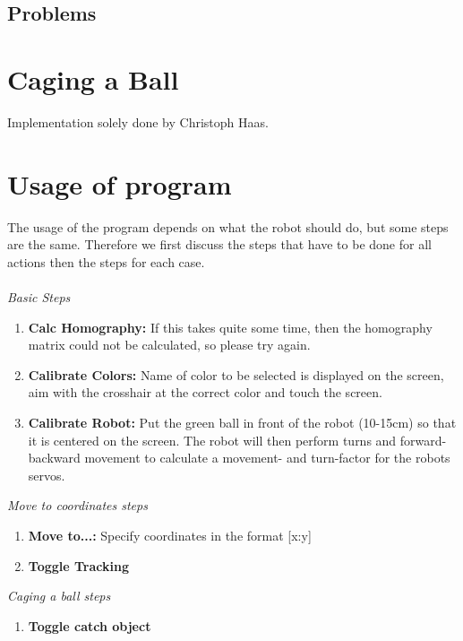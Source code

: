 \documentclass[703031]{iisreport}
\begin{document}
\subsection{Problems}


\section{Caging a Ball}
Implementation solely done by Christoph Haas.

\section{Usage of program}
The usage of the program depends on what the robot should do, but some steps are the same. Therefore we first discuss the steps that have to be done for all actions then the steps for each case.\\\\
\emph{Basic Steps}
	\begin{enumerate}
		\item \textbf{Calc Homography:} If this takes quite some time, then the homography matrix could not be calculated, so please try again.
		\item \textbf{Calibrate Colors:} Name of color to be selected is displayed on the screen, aim with the crosshair at the correct color and touch the screen.
		\item \textbf{Calibrate Robot:} Put the green ball in front of the robot (10-15cm) so that it is centered on the screen. The robot will then perform turns and forward-backward movement to calculate a movement- and turn-factor for the robots servos.\\
	\end{enumerate}
\emph{Move to coordinates steps}
	\begin{enumerate}
		\item \textbf{Move to...:} Specify coordinates in the format [x:y]
		\item \textbf{Toggle Tracking}\\
	\end{enumerate}
\emph{Caging a ball steps}
	\begin{enumerate}
		\item \textbf{Toggle catch object}
	\end{enumerate}


\end{document}
